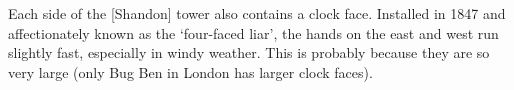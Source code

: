 \epigraph{\onehalfspacing
  Each side of the [Shandon] tower also contains a clock face. Installed in 1847 and affectionately known as the
  `four-faced liar', the hands on the east and west run slightly fast, especially in windy weather.
  This is probably because they are so very large
  (only Bug Ben in London has larger clock faces).
}{
  \cite{CorkStrolls}
}

